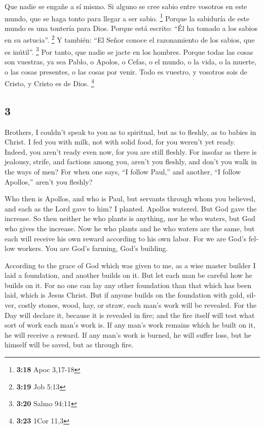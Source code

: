 \begin{paracol}{2}
 Que nadie se engañe a sí mismo. Si alguno se cree sabio
entre vosotros en este mundo, que se haga tonto para llegar a ser sabio.
\footnote{\textbf{3:18} Apoc 3,17-18}  Porque la
sabiduría de este mundo es una tontería para Dios. Porque está escrito:
``Él ha tomado a los sabios en su astucia''. \footnote{\textbf{3:19} Job
  5:13}  Y también: ``El Señor conoce el razonamiento de
los sabios, que es inútil''. \footnote{\textbf{3:20} Salmo 94:11}
 Por tanto, que nadie se jacte en los hombres. Porque
todas las cosas son vuestras,  ya sea Pablo, o Apolos, o
Cefas, o el mundo, o la vida, o la muerte, o las cosas presentes, o las
cosas por venir. Todo es vuestro,  y vosotros sois de
Cristo, y Cristo es de Dios. \footnote{\textbf{3:23} 1Cor 11,3}

\switchcolumn
\begin{otherlanguage}{english}

\hypertarget{section-5}{%
\section{3}\label{section-5}}

 Brothers, I couldn't speak to you as to spiritual, but as
to fleshly, as to babies in Christ.  I fed you with milk,
not with solid food, for you weren't yet ready. Indeed, you aren't ready
even now,  for you are still fleshly. For insofar as there
is jealousy, strife, and factions among you, aren't you fleshly, and
don't you walk in the ways of men?  For when one says, ``I
follow Paul,'' and another, ``I follow Apollos,'' aren't you fleshly?

 Who then is Apollos, and who is Paul, but servants
through whom you believed, and each as the Lord gave to him?
 I planted. Apollos watered. But God gave the increase.
 So then neither he who plants is anything, nor he who
waters, but God who gives the increase.  Now he who plants
and he who waters are the same, but each will receive his own reward
according to his own labor.  For we are God's fellow
workers. You are God's farming, God's building.

 According to the grace of God which was given to me, as
a wise master builder I laid a foundation, and another builds on it. But
let each man be careful how he builds on it.  For no one
can lay any other foundation than that which has been laid, which is
Jesus Christ.  But if anyone builds on the foundation
with gold, silver, costly stones, wood, hay, or straw, 
each man's work will be revealed. For the Day will declare it, because
it is revealed in fire; and the fire itself will test what sort of work
each man's work is.  If any man's work remains which he
built on it, he will receive a reward.  If any man's work
is burned, he will suffer loss, but he himself will be saved, but as
through fire.


\end{otherlanguage}
\end{paracol}
